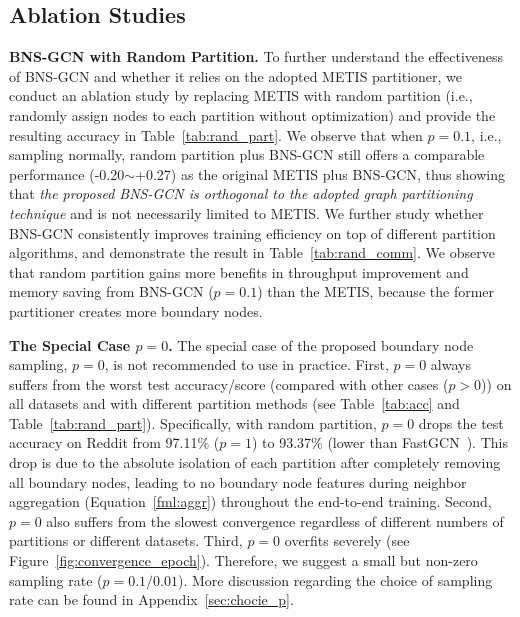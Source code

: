 \documentclass{article}
\newcommand{\niparagraph}[1]{\noindent\textbf{#1}}
\begin{document}
\subsection{Ablation Studies}

\niparagraph{BNS-GCN with Random Partition.}
To further understand the effectiveness of BNS-GCN and whether it relies on the adopted METIS partitioner, we conduct an ablation study by replacing METIS with random partition (i.e., randomly assign nodes to each partition without optimization) and provide the resulting accuracy in Table~\ref{tab:rand_part}.
We observe that when $p=0.1$, i.e., sampling normally, random partition plus BNS-GCN still offers a comparable performance (-0.20$\sim$+0.27) as the original METIS plus BNS-GCN, thus showing that \textit{the proposed BNS-GCN is orthogonal to the adopted graph partitioning technique} and is not necessarily limited to METIS. 
We further study whether BNS-GCN consistently improves training efficiency on top of different partition algorithms, and demonstrate the result in Table~\ref{tab:rand_comm}. 
We observe that random partition gains more benefits in throughput improvement and memory saving from BNS-GCN ($p=0.1$) than the METIS, because the former partitioner creates more boundary nodes.




\niparagraph{The Special Case $p=0$.}
The special case of the proposed boundary node sampling, $p=0$, is not recommended to use in practice.
First, $p=0$ always suffers from the worst test accuracy/score (compared with other cases ($p>0$)) on all datasets and with different partition methods (see Table~\ref{tab:acc} and Table~\ref{tab:rand_part}).
Specifically, with random partition, $p=0$ drops the test accuracy on Reddit from 97.11\% ($p=1$) to 93.37\% (lower than FastGCN~\citep{chen2018fastgcn}).
This drop is due to the absolute isolation of each partition after completely removing all boundary nodes, leading to no boundary node features during neighbor aggregation (Equation~\ref{fml:aggr}) throughout the end-to-end training. 
Second, $p=0$ also suffers from the slowest convergence regardless of different numbers of partitions or different datasets.
Third, $p=0$ overfits severely (see Figure~\ref{fig:convergence_epoch}).
Therefore, we suggest a small but non-zero sampling rate ($p=0.1/0.01$).
More discussion regarding the choice of sampling rate can be found in Appendix~\ref{sec:chocie_p}.
\end{document}
